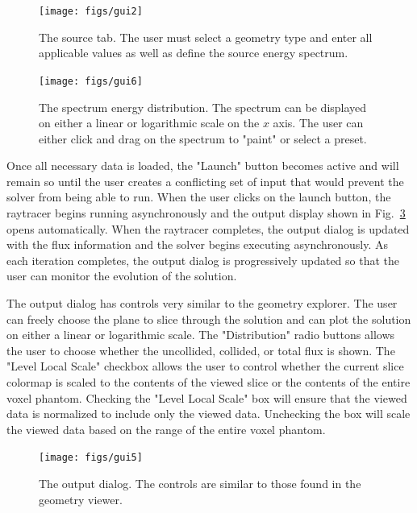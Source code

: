 \begin{figure}[tb]
  \begin{center}
   \texttt{[image: figs/gui2]}
  \end{center}
  \caption{The source tab. The user must select a geometry type and enter all applicable values as well as define the source energy spectrum.}
\label{fig:gui_src}
\end{figure}

\begin{figure}[tb]
  \begin{center}
   \texttt{[image: figs/gui6]}
  \end{center}
  \caption{The spectrum energy distribution. The spectrum can be displayed on either a linear or logarithmic scale on the $x$ axis. The user can either click and drag on the spectrum to "paint" or select a preset.}
\label{fig:gui_spect}
\end{figure}

Once all necessary data is loaded, the "Launch" button becomes active and will remain so until the user creates a conflicting set of input that would prevent the solver from being able to run. When the user clicks on the launch button, the raytracer begins running asynchronously and the output display shown in Fig.~\ref{fig:gui_out} opens automatically. When the raytracer completes, the output dialog is updated with the flux information and the solver begins executing asynchronously. As each iteration completes, the output dialog is progressively updated so that the user can monitor the evolution of the solution.

The output dialog has controls very similar to the geometry explorer. The user can freely choose the plane to slice through the solution and can plot the solution on either a linear or logarithmic scale. The "Distribution" radio buttons allows the user to choose whether the uncollided, collided, or total flux is shown. The "Level Local Scale" checkbox allows the user to control whether the current slice colormap is scaled to the contents of the viewed slice or the contents of the entire voxel phantom. Checking the "Level Local Scale" box will ensure that the viewed data is normalized to include only the viewed data. Unchecking the box will scale the viewed data based on the range of the entire voxel phantom.

\begin{figure}[tb]
  \begin{center}
   \texttt{[image: figs/gui5]}
  \end{center}
  \caption{The output dialog. The controls are similar to those found in the geometry viewer.}
\label{fig:gui_out}
\end{figure}

